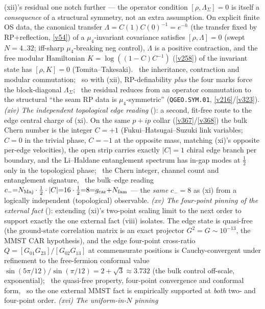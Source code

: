 (xii)'s residual one notch further --- the operator condition $[\rho,\Lambda_\Sigma]{=}0$ is itself a
\emph{consequence} of a structural symmetry, not an extra assumption. On explicit finite OS data, the canonical
transfer $\Lambda{=}C(1)C(0)^{-1}{=}e^{-h}$ (the transfer fixed by RP$+$reflection, \vref{v54}) of a
$\mu_4$-invariant covariance satisfies $[\rho,\Lambda]{=}0$ (swept $N{=}4..32$; iff-sharp $\mu_4$-breaking neg
control), $\Lambda$ is a positive contraction, and the free modular Hamiltonian $K{=}\log((1{-}C)C^{-1})$
(\vref{v258}) of the invariant state has $[\rho,K]{=}0$ (Tomita--Takesaki). \mE\ the inheritance, contraction and
modular commutation; \mC\ so with (xii), RP-definability \emph{plus} the four marks force the block-diagonal
$\Lambda_\Sigma$; \mO\ the residual reduces from an operator commutation to the structural ``the seam RP data is
$\mu_4$-symmetric'' (\texttt{QGEO.SYM.01}, \vref{v216}/\vref{v323}). \emph{(xiv) The independent topological edge
reading} (): a second, fit-free route to the edge central charge of (xi). On the
same $p{+}ip$ collar (\vref{v367}/\vref{v368}) the bulk Chern number is the integer $C{=}{+}1$
(Fukui--Hatsugai--Suzuki link variables; $C{=}0$ in the trivial phase, $C{=}{-}1$ at the opposite mass, matching
(xi)'s opposite per-edge velocities), the open strip carries exactly $|C|{=}1$ chiral edge branch per boundary, and
the Li--Haldane entanglement spectrum has in-gap modes at $\tfrac12$ only in the topological phase; \mE\ the Chern
integer, channel count and entanglement signature, \mC\ the bulk--edge reading $c_-{=}N_{\mathrm{Maj}}\cdot\tfrac12
\cdot|C|{=}16\cdot\tfrac12{=}8{=}g_{\mathrm{car}}{+}N_{\mathrm{fam}}$ --- the \emph{same} $c_-{=}8$ as (xi) from a logically independent
(topological) observable. \emph{(xv) The four-point pinning of the external fact}
(): extending (xi)'s two-point scaling limit to the next order to support
exactly the one external fact (viii) isolates. The edge state is quasi-free (the ground-state correlation matrix is
an exact projector $G^2{=}G\sim10^{-13}$, the MMST CAR hypothesis), and the edge four-point cross-ratio
$Q{=}[G_{01}G_{23}]/[G_{02}G_{13}]$ at commensurate positions is Cauchy-convergent under refinement to the
free-fermion conformal value $\sin(5\pi/12)/\sin(\pi/12){=}2{+}\sqrt3\approx3.732$ (the bulk control off-scale,
exponential); \mE\ the quasi-free property, four-point convergence and conformal form, \mC\ so the one external MMST
fact is empirically supported at \emph{both} two- and four-point order. \emph{(xvi) The uniform-in-$N$ pinning}
